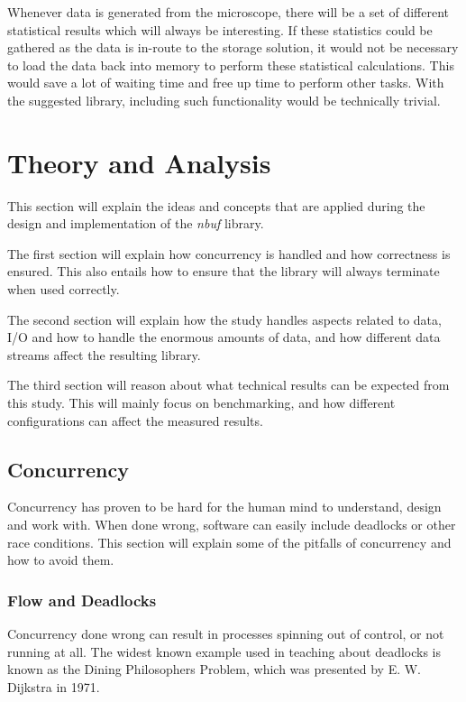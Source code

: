 \documentclass[a4paper]{article}
\newcommand{\nbuf}{\textit{nbuf} }
\begin{document}
Whenever data is generated from the microscope, there will be a set of different statistical results which will always be interesting. If these statistics could be gathered as the data is in-route to the storage solution, it would not be necessary to load the data back into memory to perform these statistical calculations. This would save a lot of waiting time and free up time to perform other tasks. With the suggested library, including such functionality would be technically trivial.


\newpage
\section{Theory and Analysis}
This section will explain the ideas and concepts that are applied during the design and implementation of the \nbuf library. 

The first section will explain how concurrency is handled and how correctness is ensured. This also entails how to ensure that the library will always terminate when used correctly. 

The second section will explain how the study handles aspects related to data, I/O and how to handle the enormous amounts of data, and how different data streams affect the resulting library.

The third section will reason about what technical results can be expected from this study. This will mainly focus on benchmarking, and how different configurations can affect the measured results.



\subsection{Concurrency}
Concurrency has proven to be hard for the human mind to understand, design and work with. When done wrong, software can easily
include deadlocks or other race conditions. This section will explain some of the pitfalls of concurrency and how to avoid them.


\subsubsection{Flow and Deadlocks}
Concurrency done wrong can result in processes spinning out of control, or not running at all. The widest known example used in teaching about deadlocks is known as the Dining Philosophers Problem, which was presented by E. W. Dijkstra in 1971\cite{Dijkstra:2002:HOS:762971.762977}. 
\end{document}
